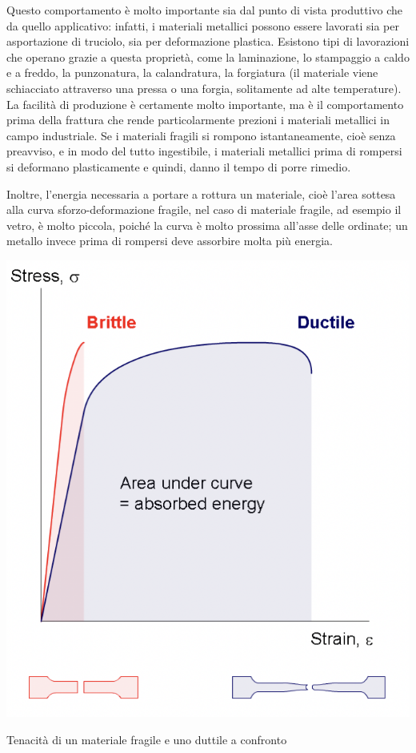 Questo comportamento è molto importante sia dal punto di vista produttivo che da quello applicativo: infatti, i materiali metallici possono essere lavorati sia per asportazione di truciolo, sia per deformazione plastica. Esistono tipi di lavorazioni che operano grazie a questa proprietà, come la laminazione, lo stampaggio a caldo e a freddo, la punzonatura, la calandratura, la forgiatura (il materiale viene schiacciato attraverso una pressa o una forgia, solitamente ad alte temperature).\\
La facilità di produzione è certamente molto importante, ma è il comportamento prima della frattura che rende particolarmente prezioni i materiali metallici in campo industriale. Se i materiali fragili si rompono istantaneamente, cioè senza preavviso, e in modo del tutto ingestibile, i materiali metallici prima di rompersi si deformano plasticamente e quindi, danno il tempo di porre rimedio. 

Inoltre, l’energia necessaria a portare a rottura un materiale, cioè l’area sottesa alla curva sforzo-deformazione fragile, nel caso di materiale fragile, ad esempio il vetro, è molto piccola, poiché la curva è molto prossima all’asse delle ordinate; un metallo invece prima di rompersi deve assorbire molta più energia.\\ 
\begin{marginfigure}
\includegraphics{images/img29.png}
\caption{Tenacità di un materiale fragile e uno duttile a confronto}
\end{marginfigure}

